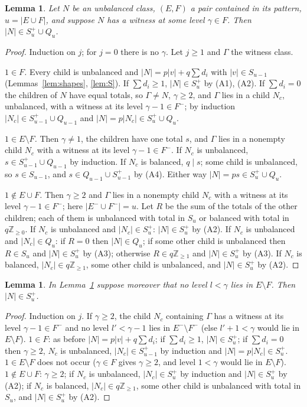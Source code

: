 \documentclass[11pt,a4paper]{amsart}
\newtheorem{lemma}[theorem]{Lemma}
\theoremstyle{definition}
\theoremstyle{remark}
\newcommand{\Z}{\mathbb{Z}}
\newcommand{\Sp}{S^{+}}
\begin{document}
\begin{lemma}\label{lem:Sp}
Let $N$ be an unbalanced class, $(E,F)$ a pair contained in its pattern, $u=|E\cup F|$, and suppose $N$ has
a witness at some level $\gamma\in F$. Then $|N|\in\Sp_u\cup Q_u$.
\end{lemma}
\begin{proof}
Induction on $j$; for $j=0$ there is no $\gamma$. Let $j\ge1$ and $\Gamma$ the witness class.

\emph{$1\in F$.} Every child is unbalanced and $|N|=p|v|+q\sum d_i$ with $|v|\in S_{u-1}$
(Lemmas~\ref{lem:shapes}, \ref{lem:S}). If $\sum d_i\ge1$, $|N|\in\Sp_u$ by (A1), (A2). If $\sum d_i=0$ the
children of $N$ have equal totals, so $\Gamma\ne N$, $\gamma\ge2$, and $\Gamma$ lies in a child $N_c$, unbalanced,
with a witness at its level $\gamma-1\in F^-$; by induction $|N_c|\in\Sp_{u-1}\cup Q_{u-1}$ and
$|N|=p|N_c|\in\Sp_u\cup Q_u$.

\emph{$1\in E\setminus F$.} Then $\gamma\ne1$, the children have one total $s$, and $\Gamma$ lies in a nonempty
child $N_c$ with a witness at its level $\gamma-1\in F^-$. If $N_c$ is unbalanced, $s\in\Sp_{u-1}\cup Q_{u-1}$ by
induction. If $N_c$ is balanced, $q\mid s$; some child is unbalanced, so $s\in S_{u-1}$, and
$s\in Q_{u-1}\cup\Sp_{u-1}$ by (A4). Either way $|N|=ps\in\Sp_u\cup Q_u$.

\emph{$1\notin E\cup F$.} Then $\gamma\ge2$ and $\Gamma$ lies in a nonempty child $N_c$ with a witness at its
level $\gamma-1\in F^-$; here $|E^-\cup F^-|=u$. Let $R$ be the sum of the totals of the other children; each of
them is unbalanced with total in $S_u$ or balanced with total in $q\Z_{\ge0}$. If $N_c$ is unbalanced and
$|N_c|\in\Sp_u$: $|N|\in\Sp_u$ by (A2). If $N_c$ is unbalanced and $|N_c|\in Q_u$: if $R=0$ then
$|N|\in Q_u$; if some other child is unbalanced then $R\in S_u$ and $|N|\in\Sp_u$ by (A3); otherwise
$R\in q\Z_{\ge1}$ and $|N|\in\Sp_u$ by (A3). If $N_c$ is balanced, $|N_c|\in q\Z_{\ge1}$, some other child is
unbalanced, and $|N|\in\Sp_u$ by (A2).
\end{proof}

\begin{lemma}\label{lem:Spp}
In Lemma~\ref{lem:Sp} suppose moreover that no level $l<\gamma$ lies in $E\setminus F$. Then $|N|\in\Sp_u$.
\end{lemma}
\begin{proof}
Induction on $j$. If $\gamma\ge2$, the child $N_c$ containing $\Gamma$ has a witness at its level $\gamma-1\in F^-$
and no level $l'<\gamma-1$ lies in $E^-\setminus F^-$ (else $l'+1<\gamma$ would lie in $E\setminus F$). \emph{$1\in F$}: as before
$|N|=p|v|+q\sum d_i$; if $\sum d_i\ge1$, $|N|\in\Sp_u$; if $\sum d_i=0$ then $\gamma\ge2$, $N_c$ is unbalanced,
$|N_c|\in\Sp_{u-1}$ by induction and $|N|=p|N_c|\in\Sp_u$. \emph{$1\in E\setminus F$} does not occur
($\gamma\in F$ gives $\gamma\ge2$, and level $1<\gamma$ would lie in $E\setminus F$). \emph{$1\notin E\cup F$}: $\gamma\ge 2$; if
$N_c$ is unbalanced, $|N_c|\in\Sp_u$ by induction and $|N|\in\Sp_u$ by (A2); if $N_c$ is balanced,
$|N_c|\in q\Z_{\ge1}$, some other child is unbalanced with total in $S_u$, and $|N|\in\Sp_u$ by (A2).
\end{proof}
\end{document}
